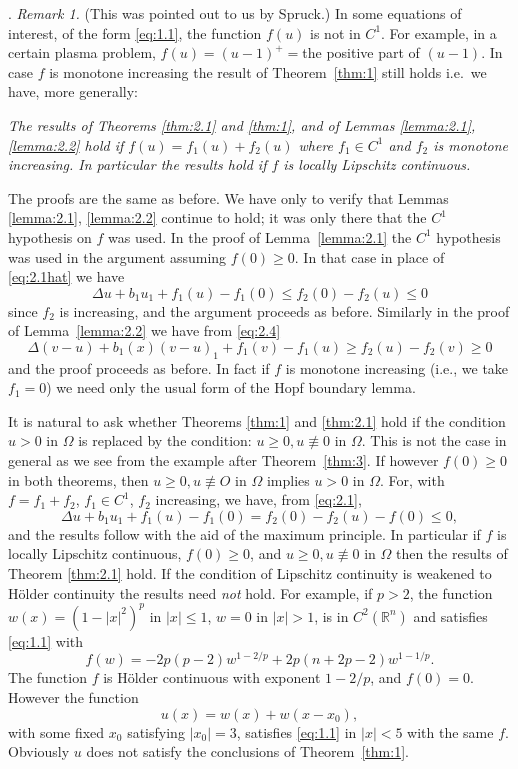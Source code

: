 . \emph{Remark 1.} (This was pointed out to us by Spruck.)
In some equations of interest, of the form \eqref{eq:1.1},
the function $f(u)$ is not in $C^1$. For example, in a certain plasma problem,
$f(u)=(u-1)^+ =$the positive part of $(u-1)$. In case $f$ is monotone increasing
the result of Theorem~\ref{thm:1} still holds i.e.~we have, more generally:

{\itshape The results of Theorems \ref{thm:2.1} and \ref{thm:1},
and of Lemmas \ref{lemma:2.1}, \ref{lemma:2.2} hold if $f(u)= f_1(u) + f_2(u)$
where $f_1\in C^1$ and $f_2$ is monotone increasing. In particular the results hold if
$f$ is locally Lipschitz continuous.}

The proofs are the same as before. We have only to verify that Lemmas \ref{lemma:2.1},
\ref{lemma:2.2} continue to hold; it was only there that the $C^1$ hypothesis on $f$ was used.
In the proof of Lemma~\ref{lemma:2.1} the $C^1$ hypothesis was used in the argument
assuming $f(0)\geq 0$. In that case in place of \eqref{eq:2.1hat} we have
\[\Delta u + b_1u_1 + f_1(u) - f_1(0) \leq f_2(0) - f_2(u) \leq 0\]
since $f_2$ is increasing, and the argument proceeds as before.
Similarly in the proof of Lemma~\ref{lemma:2.2} we have from \eqref{eq:2.4}
\[\Delta(v-u) + b_1(x)(v-u)_1 + f_1(v) - f_1(u) \geq f_2(u) - f_2(v) \geq 0\]
and the proof proceeds as before.
In fact if $f$ is monotone increasing (i.e., we take $f_1=0$)
we need only the usual form of the Hopf boundary lemma.

It is natural to ask whether Theorems \ref{thm:1} and \ref{thm:2.1} hold 
if the condition $u > 0$ in $\Omega$ is replaced by the condition: $u \geq 0, u \not\equiv 0$
in $\Omega$. This is not the case in general as we see from the example after Theorem~\ref{thm:3}. 
If however $f(0)\geq 0$ in both theorems, then $u\geq 0, u\not\equiv O$ in $\Omega$ 
implies $u>0$ in $\Omega$. For, with $f=f_1 + f_2$, $f_1\in C^1$, $f_2$ increasing,
we have, from \eqref{eq:2.1},
\[\Delta u + b_1u_1 + f_1(u) - f_1(0)
  = f_2(0) - f_2(u) - f(0) \leq 0,\]
and the results follow with the aid of the maximum principle.
In particular if $f$ is locally Lipschitz continuous, $f(0) \geq 0$,
and $u\geq 0, u\not\equiv 0$ in $\Omega$ then the results of Theorem \ref{thm:2.1} hold.
If the condition of Lipschitz continuity is weakened to H\"older continuity
the results need \emph{not} hold.
For example, if $p>2$, the function $w(x)=(1-|x|^2)^p$ in $|x|\leq 1$,
$w=0$ in $|x|>1$, is in $C^2(\mathbb{R}^n)$ and satisfies \eqref{eq:1.1} with
\[f(w) = -2p(p-2)w^{1-2/p} + 2p(n+2p-2)w^{1-1/p}.\]
The function $f$ is H\"older continuous with exponent $1-2/p$, and $f(0)=0$.
However the function
\[u(x) = w(x) + w(x-x_0),\]
with some fixed $x_0$ satisfying $|x_0|=3$, satisfies \eqref{eq:1.1}
in $|x|<5$ with the same $f$.
Obviously $u$ does not satisfy the conclusions of Theorem~\ref{thm:1}.

